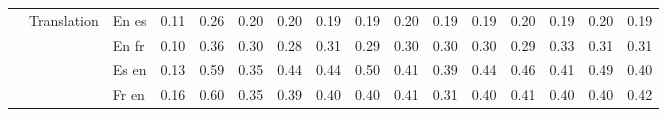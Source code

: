 \begin{center}
\begin{longtable}{lllrrrrrrrrrrrrr}
\cline{2-16}
 & \multirow[t]{4}{*}{Translation} & En es & 0.11 & 0.26 & 0.20 & 0.20 & 0.19 & 0.19 & 0.20 & 0.19 & 0.19 & 0.20 & 0.19 & 0.20 & 0.19 \\
 &  & En fr & 0.10 & 0.36 & 0.30 & 0.28 & 0.31 & 0.29 & 0.30 & 0.30 & 0.30 & 0.29 & 0.33 & 0.31 & 0.31 \\
 &  & Es en & 0.13 & 0.59 & 0.35 & 0.44 & 0.44 & 0.50 & 0.41 & 0.39 & 0.44 & 0.46 & 0.41 & 0.49 & 0.40 \\
 &  & Fr en & 0.16 & 0.60 & 0.35 & 0.39 & 0.40 & 0.40 & 0.41 & 0.31 & 0.40 & 0.41 & 0.40 & 0.40 & 0.42 \\
\cline{1-16} \cline{2-16}
\bottomrule
\end{longtable}

\end{center}
\twocolumn